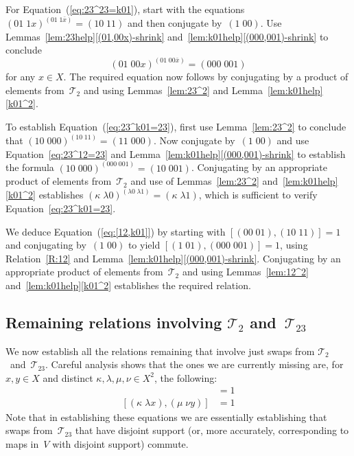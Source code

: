 \documentclass[a4paper,11pt]{article}
\numberwithin{equation}{section}
\newcommand{\eqstate}[1]{Equation~(\ref{#1})}
\newcommand{\swap}[2]{(#1\;#2)}
\newcommand{\Sw}[1]{\mathcal{T}_{#1}}
\begin{document}
For \eqstate{eq:23^23=k01}, start with the equations
$\swap{01}{1x}^{\swap{01}{1\bar{x}}} = \swap{10}{11}$ and then
conjugate by~$\swap{1}{00}$.  Use
Lemmas~\ref{lem:23help}\ref{(01,00x)-shrink}
and~\ref{lem:k01help}\ref{(000,001)-shrink} to conclude
\[
\swap{01}{00x}^{\swap{01}{00\bar{x}}} = \swap{000}{001}
\]
for any $x \in X$.  The required equation now follows by conjugating
by a product of elements from~$\Sw{2}$ and using Lemmas~\ref{lem:23^2}
and Lemma~\ref{lem:k01help}\ref{k01^2}.

To establish \eqstate{eq:23^k01=23}, first use Lemma~\ref{lem:23^2} to
conclude that $\swap{10}{000}^{\swap{10}{11}} = \swap{11}{000}$.  Now
conjugate by~$\swap{1}{00}$ and use Equation~\eqref{eq:23^12=23} and
Lemma~\ref{lem:k01help}\ref{(000,001)-shrink} to establish the formula
$\swap{10}{000}^{\swap{000}{001}} = \swap{10}{001}$.  Conjugating by
an appropriate product of elements from~$\Sw{2}$ and use of
Lemmas~\ref{lem:23^2} and~\ref{lem:k01help}\ref{k01^2} establishes
$\swap{\kappa}{\lambda0}^{\swap{\lambda0}{\lambda1}} =
\swap{\kappa}{\lambda1}$, which is sufficient to verify
Equation~\eqref{eq:23^k01=23}.

We deduce \eqstate{eq:[12,k01]} by starting with $[
  \swap{00}{01} , \swap{10}{11} ] = 1$ and conjugating
by~$\swap{1}{00}$ to yield $[ \swap{1}{01} , \swap{000}{001} ] = 1$,
using Relation~\ref{R:12} and
Lemma~\ref{lem:k01help}\ref{(000,001)-shrink}.  Conjugating by an
appropriate product of elements from~$\Sw{2}$ and using
Lemmas~\ref{lem:12^2} and~\ref{lem:k01help}\ref{k01^2} establishes the
required relation.

\subsection{\boldmath Remaining relations involving $\Sw{2}$
  and~$\Sw{23}$}

We now establish all the relations remaining that involve just swaps
from $\Sw{2}$~and~$\Sw{23}$.  Careful analysis shows that the ones we
are currently missing are, for $x,y \in X$ and distinct
$\kappa,\lambda,\mu,\nu \in X^{2}$, the following:
\begin{align}
  [ \swap{\kappa}{\lambda0} , \swap{\mu}{\lambda1} ] &= 1
  \label{eq:[23-k0,23-k1]} \\
  [ \swap{\kappa}{\lambda x} , \swap{\mu}{\nu y} ] &= 1
  \label{eq:[23,23]}
\end{align}
Note that in establishing these equations we are essentially
establishing that swaps from~$\Sw{23}$ that have disjoint support (or,
more accurately, corresponding to maps in~$V$ with disjoint support)
commute.
\end{document}

